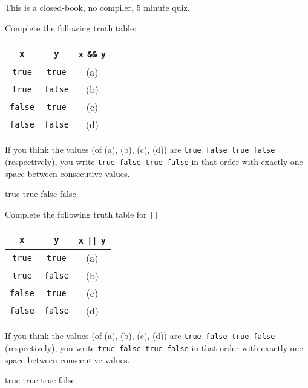 

This is a closed-book, no compiler, 5 minute quiz.

\nextq
Complete the following truth table:
\begin{longtable}{|c|c||c|}\hline
 \verb!x!	& \verb!y! 	& \verb!x! \verb!&&! \verb!y! \\ \hline
 \verb!true!	& \verb!true!	& (a)                         \\ \hline
 \verb!true!	& \verb!false!  & (b)                         \\ \hline
 \verb!false!	& \verb!true!   & (c)                         \\ \hline
 \verb!false!   & \verb!false!  & (d)                         \\ \hline
\end{longtable}
\vspace{-0.2cm}
If you think the values (of (a), (b), (c), (d)) are
\verb!true false true false! (respectively), you
write
\verb!true false true false! in that order with exactly one space between
consecutive values.
\\
\ANSWER
\begin{answercode}
true true false false
\end{answercode}

\nextq
Complete the following truth table for \verb!||!
\begin{longtable}{|c|c||c|}\hline
\verb!x!       & \verb!y!      & \verb!x! \verb!||! \verb!y! \\ \hline
\verb!true!    & \verb!true!   & (a) \\ \hline
\verb!true!    & \verb!false!  & (b) \\ \hline
\verb!false!   & \verb!true!   & (c) \\ \hline
\verb!false!   & \verb!false!  & (d) \\ \hline
\end{longtable}
If you think the values (of (a), (b), (c), (d)) are
\verb!true false true false! (respectively), you
write
\verb!true false true false! in that order with exactly one space between
consecutive values.
\\
\ANSWER
\begin{answercode}
true true true false
\end{answercode}

